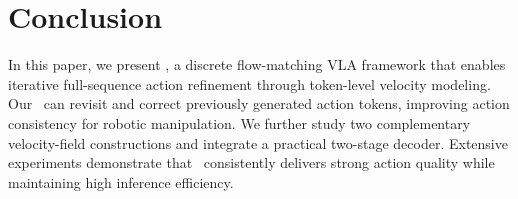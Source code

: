 \section{Conclusion}

In this paper, we present \method, a discrete flow-matching VLA framework that enables iterative full-sequence action refinement through token-level velocity modeling. Our \method~can revisit and correct previously generated action tokens, improving action consistency for robotic manipulation.
We further study two complementary velocity-field constructions and integrate a practical two-stage decoder. Extensive experiments demonstrate that \method~consistently delivers strong action quality while maintaining high inference efficiency.









%
%
